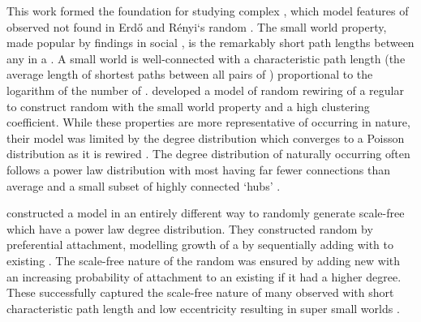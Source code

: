 This work formed the foundation for studying complex  \citep{vanSteen2010}, which model features of observed  not found in Erd\H{o} and R\'enyi`s random  \citep{Erdos1959, Erdos1960}. The \gls{small world} property, made popular by findings in social  \citep{Travers1969}, is the remarkably short path lengths between any  in a . A \gls{small world}  is well-connected with a characteristic path length (the average length of \glspl{shortest path} between all pairs of ) proportional to the logarithm of the number of . \citet{Watts1998} developed a model of random rewiring of a regular  to construct random  with the \gls{small world} property and a high clustering coefficient. While these properties are more representative of  occurring in nature, their model was limited by the degree distribution which converges to a Poisson distribution as it is rewired \citep{Barrat2000}. 
The  degree distribution of naturally occurring  often follows a power law distribution with most  having far fewer connections than average and a small subset of highly connected  `hubs' \citep{Barabasi1999}.

\citet{Barabasi1999} constructed a  model in an entirely different way to randomly generate \gls{scale-free}  which have a power law degree distribution. They constructed random  by preferential attachment, modelling growth of a  by sequentially adding  with  to existing . The \gls{scale-free} nature of the random  was ensured by adding new  with an increasing probability of attachment to an existing  if it had a higher degree. These  successfully captured the \gls{scale-free} nature of many observed  with short characteristic path length and low eccentricity resulting in super \glspl{small world} \citep{Barabasi1999}. %


